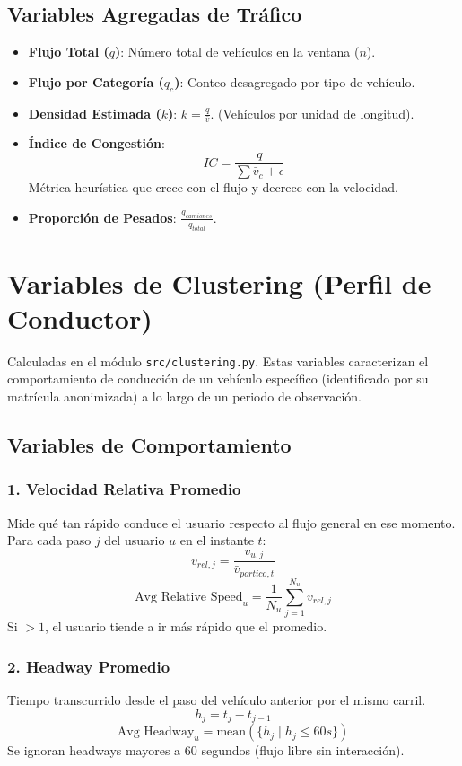 \documentclass{article}
\begin{document}
\subsection{Variables Agregadas de Tráfico}
\begin{itemize}
    \item \textbf{Flujo Total ($q$)}: Número total de vehículos en la ventana ($n$).
    \item \textbf{Flujo por Categoría ($q_c$)}: Conteo desagregado por tipo de vehículo.
    \item \textbf{Densidad Estimada ($k$)}: $k = \frac{q}{\bar{v}}$. (Vehículos por unidad de longitud).
    \item \textbf{Índice de Congestión}:
    \[ IC = \frac{q}{\sum \bar{v}_c + \epsilon} \]
    Métrica heurística que crece con el flujo y decrece con la velocidad.
    \item \textbf{Proporción de Pesados}: $\frac{q_{camiones}}{q_{total}}$.
\end{itemize}

\section{Variables de Clustering (Perfil de Conductor)}
Calculadas en el módulo \texttt{src/clustering.py}. Estas variables caracterizan el comportamiento de conducción de un vehículo específico (identificado por su matrícula anonimizada) a lo largo de un periodo de observación.

\subsection{Variables de Comportamiento}

\subsubsection{1. Velocidad Relativa Promedio}
Mide qué tan rápido conduce el usuario respecto al flujo general en ese momento.
Para cada paso $j$ del usuario $u$ en el instante $t$:
\[ v_{rel, j} = \frac{v_{u,j}}{\bar{v}_{portico, t}} \]
\[ \text{Avg Relative Speed}_u = \frac{1}{N_u} \sum_{j=1}^{N_u} v_{rel, j} \]
Si $> 1$, el usuario tiende a ir más rápido que el promedio.

\subsubsection{2. Headway Promedio}
Tiempo transcurrido desde el paso del vehículo anterior por el mismo carril.
\[ h_j = t_{j} - t_{j-1} \]
\[ \text{Avg Headway}_u = \text{mean}(\{h_j \mid h_j \le 60s\}) \]
Se ignoran headways mayores a 60 segundos (flujo libre sin interacción).
\end{document}
